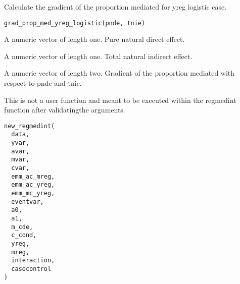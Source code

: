 \documentclass[a4paper]{book}
\begin{document}
%
\begin{Description}
Calculate the gradient of the proportion mediated for yreg logistic case.
\end{Description}
%
\begin{Usage}
\begin{verbatim}
grad_prop_med_yreg_logistic(pnde, tnie)
\end{verbatim}
\end{Usage}
%
\begin{Arguments}
\begin{ldescription}
\item[\code{pnde}] A numeric vector of length one. Pure natural direct effect.

\item[\code{tnie}] A numeric vector of length one. Total natural indirect effect.
\end{ldescription}
\end{Arguments}
%
\begin{Value}
A numeric vector of length two. Gradient of the proportion mediated with respect to pnde and tnie.
\end{Value}
%
\begin{Description}
This is not a user function and meant to be executed within the regmedint function after validatingthe arguments.
\end{Description}
%
\begin{Usage}
\begin{verbatim}
new_regmedint(
  data,
  yvar,
  avar,
  mvar,
  cvar,
  emm_ac_mreg,
  emm_ac_yreg,
  emm_mc_yreg,
  eventvar,
  a0,
  a1,
  m_cde,
  c_cond,
  yreg,
  mreg,
  interaction,
  casecontrol
)
\end{verbatim}
\end{Usage}
%
\end{document}
